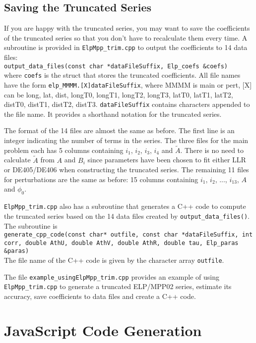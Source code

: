 \documentclass[12pt]{article}
\begin{document}
\subsection{Saving the Truncated Series}

If you are happy with the truncated series, you may want to save the coefficients 
of the truncated series so that you don't have to recalculate them every time. 
A subroutine is provided in {\tt ElpMpp\_trim.cpp} to output the coefficients 
to 14 data files: \\
{\tt output\_data\_files(const char *dataFileSuffix, Elp\_coefs \&coefs)} \\
where {\tt coefs} is the struct that stores the truncated coefficients. All 
file names have the form {\tt elp\_MMMM.[X]dataFileSuffix}, where MMMM is 
main or pert, [X] can be long, lat, dist, longT0, longT1, longT2, longT3, 
latT0, latT1, latT2, distT0, distT1, distT2, distT3. {\tt dataFileSuffix} contains 
characters appended to the file name. It provides a shorthand notation
for the truncated series.

The format of the 14 files are almost the same as before. The first line is 
an integer indicating the number of terms in the series. The three files for the 
main problem each has 5 columns containing $i_1$, $i_2$, $i_3$, $i_4$ and 
$\tilde{A}$. There is no need to calculate $\tilde{A}$ from $A$ and $B_i$ since 
parameters have been chosen to fit either LLR or DE405/DE406 when constructing 
the truncated series. The remaining 11 files for perturbations are the same 
as before: 15 columns containing $i_1$, $i_2$, ..., $i_{13}$, $A$ and $\phi_0$. 

{\tt ElpMpp\_trim.cpp} also has a subroutine that generates a C++ code to compute 
the truncated series based on the 14 data files created by {\tt output\_data\_files()}. 
The subroutine is \\
{\tt generate\_cpp\_code(const char* outfile, const char *dataFileSuffix, int corr,
                       double AthU, double AthV, double AthR, double tau,
                       Elp\_paras \&paras)} \\
The file name of the C++ code is given by the character array {\tt outfile}. 

The file {\tt example\_usingElpMpp\_trim.cpp} provides an example of 
using {\tt ElpMpp\_trim.cpp} to generate a truncated ELP/MPP02 series, 
estimate its accuracy, save coefficients to data files and create a C++ code.

\section{JavaScript Code Generation}
\end{document}
